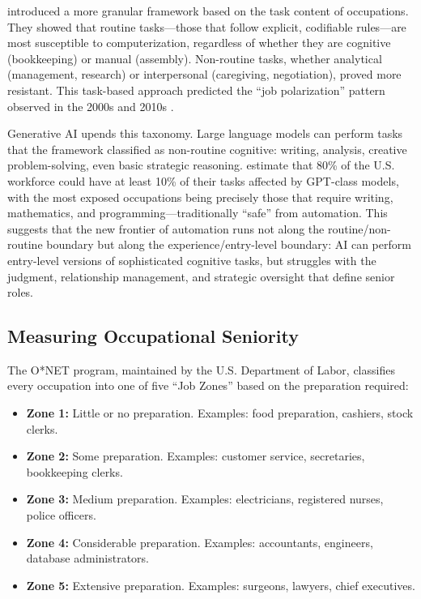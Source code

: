 \documentclass[12pt]{article}
\begin{document}
\citet{autor2003} introduced a more granular framework based on the task content of occupations. They showed that routine tasks---those that follow explicit, codifiable rules---are most susceptible to computerization, regardless of whether they are cognitive (bookkeeping) or manual (assembly). Non-routine tasks, whether analytical (management, research) or interpersonal (caregiving, negotiation), proved more resistant. This task-based approach predicted the ``job polarization'' pattern observed in the 2000s and 2010s \citep{autor2013}.

Generative AI upends this taxonomy. Large language models can perform tasks that the \citet{autor2003} framework classified as non-routine cognitive: writing, analysis, creative problem-solving, even basic strategic reasoning. \citet{eloundou2024} estimate that 80\% of the U.S. workforce could have at least 10\% of their tasks affected by GPT-class models, with the most exposed occupations being precisely those that require writing, mathematics, and programming---traditionally ``safe'' from automation. This suggests that the new frontier of automation runs not along the routine/non-routine boundary but along the experience/entry-level boundary: AI can perform entry-level versions of sophisticated cognitive tasks, but struggles with the judgment, relationship management, and strategic oversight that define senior roles.

\subsection{Measuring Occupational Seniority}

The O*NET program, maintained by the U.S. Department of Labor, classifies every occupation into one of five ``Job Zones'' based on the preparation required:

\begin{itemize}
\item \textbf{Zone 1:} Little or no preparation. Examples: food preparation, cashiers, stock clerks.
\item \textbf{Zone 2:} Some preparation. Examples: customer service, secretaries, bookkeeping clerks.
\item \textbf{Zone 3:} Medium preparation. Examples: electricians, registered nurses, police officers.
\item \textbf{Zone 4:} Considerable preparation. Examples: accountants, engineers, database administrators.
\item \textbf{Zone 5:} Extensive preparation. Examples: surgeons, lawyers, chief executives.
\end{itemize}
\end{document}
